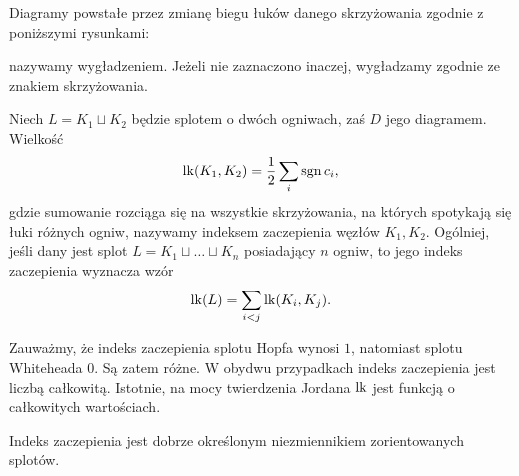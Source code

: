 \begin{definition}[wygładzenie]
%
    Diagramy powstałe przez zmianę biegu łuków danego skrzyżowania zgodnie z poniższymi rysunkami:

\noindent
    nazywamy wygładzeniem.
    Jeżeli nie zaznaczono inaczej, wygładzamy zgodnie ze znakiem skrzyżowania.
\end{definition}

\begin{definition}
    Niech $L = K_1 \sqcup K_2$ będzie splotem o dwóch ogniwach, zaś $D$ jego diagramem.
    Wielkość
    \begin{equation}
        \operatorname{lk}(K_1, K_2) = \frac 12 \sum_i \operatorname{sgn} c_i,
    \end{equation}
    gdzie sumowanie rozciąga się na wszystkie skrzyżowania, na których spotykają się łuki różnych ogniw, nazywamy indeksem zaczepienia węzłów $K_1, K_2$.
    Ogólniej, jeśli dany jest splot $L = K_1 \sqcup \ldots \sqcup K_n$ posiadający $n$ ogniw, to jego indeks zaczepienia wyznacza wzór
    \begin{equation}
        \operatorname{lk}(L) = \sum_{i < j} \operatorname{lk}(K_i, K_j).
    \end{equation}
\end{definition}

Zauważmy, że indeks zaczepienia splotu Hopfa wynosi $1$, natomiast splotu Whiteheada $0$.
%
%
Są zatem różne.
W obydwu przypadkach indeks zaczepienia jest liczbą całkowitą.
Istotnie, na mocy twierdzenia Jordana $\operatorname{lk}$ jest funkcją o całkowitych wartościach.

\begin{proposition}
    Indeks zaczepienia jest dobrze określonym niezmiennikiem zorientowanych splotów.
\end{proposition}

